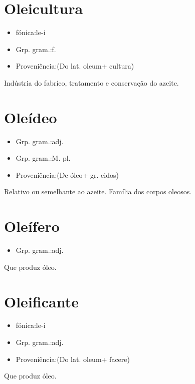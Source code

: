 \section{Oleicultura}
\begin{itemize}
\item {fónica:le-i}
\end{itemize}
\begin{itemize}
\item {Grp. gram.:f.}
\end{itemize}
\begin{itemize}
\item {Proveniência:(Do lat. \textunderscore oleum\textunderscore  + \textunderscore cultura\textunderscore )}
\end{itemize}
Indústria do fabríco, tratamento e conservação do azeite.
\section{Oleídeo}
\begin{itemize}
\item {Grp. gram.:adj.}
\end{itemize}
\begin{itemize}
\item {Grp. gram.:M. pl.}
\end{itemize}
\begin{itemize}
\item {Proveniência:(De \textunderscore óleo\textunderscore  + gr. \textunderscore eidos\textunderscore )}
\end{itemize}
Relativo ou semelhante ao azeite.
Família dos corpos oleosos.
\section{Oleífero}
\begin{itemize}
\item {Grp. gram.:adj.}
\end{itemize}
Que produz óleo.
\section{Oleificante}
\begin{itemize}
\item {fónica:le-i}
\end{itemize}
\begin{itemize}
\item {Grp. gram.:adj.}
\end{itemize}
\begin{itemize}
\item {Proveniência:(Do lat. \textunderscore oleum\textunderscore  + \textunderscore facere\textunderscore )}
\end{itemize}
Que produz óleo.
